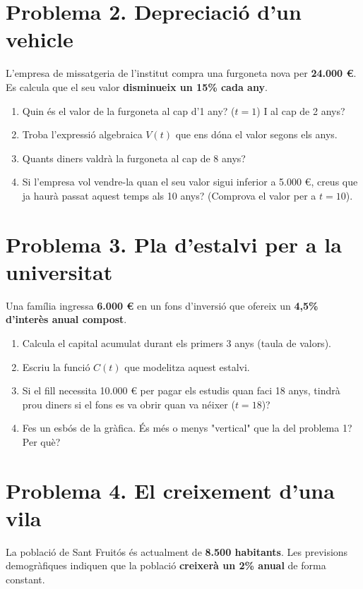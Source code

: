 \documentclass[12pt,a4paper]{article}
\begin{document}
\section*{Problema 2. Depreciació d'un vehicle}
L'empresa de missatgeria de l'institut compra una furgoneta nova per \textbf{24.000 \euro}. Es calcula que el seu valor \textbf{disminueix un 15\% cada any}.

\begin{enumerate}[label=\alph*)]
    \item Quin és el valor de la furgoneta al cap d'1 any? ($t=1$) I al cap de 2 anys?
    \item Troba l'expressió algebraica $V(t)$ que ens dóna el valor segons els anys.
    \item Quants diners valdrà la furgoneta al cap de 8 anys? 
    \item Si l'empresa vol vendre-la quan el seu valor sigui inferior a 5.000 \euro, creus que ja haurà passat aquest temps als 10 anys? (Comprova el valor per a $t=10$).
\end{enumerate}

\newpage

\section*{Problema 3. Pla d'estalvi per a la universitat}
Una família ingressa \textbf{6.000 \euro} en un fons d'inversió que ofereix un \textbf{4,5\% d'interès anual compost}.

\begin{enumerate}[label=\alph*)]
    \item Calcula el capital acumulat durant els primers 3 anys (taula de valors).
    \item Escriu la funció $C(t)$ que modelitza aquest estalvi.
    \item Si el fill necessita 10.000 \euro{} per pagar els estudis quan faci 18 anys, tindrà prou diners si el fons es va obrir quan va néixer ($t=18$)?
    \item Fes un esbós de la gràfica. És més o menys "vertical" que la del problema 1? Per què?
\end{enumerate}

\section*{Problema 4. El creixement d'una vila}
La població de Sant Fruitós és actualment de \textbf{8.500 habitants}. Les previsions demogràfiques indiquen que la població \textbf{creixerà un 2\% anual} de forma constant.
\end{document}
